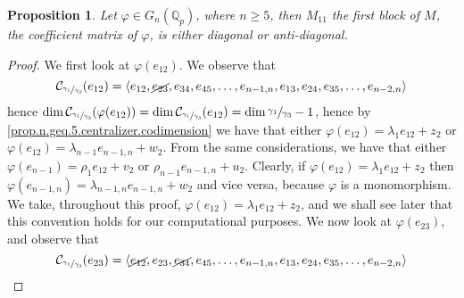 \documentclass[12pt]{article}
\newtheorem{proposition}[theorem]{Proposition}
\begin{document}
\begin{proposition}
\label{m11.n.5}
Let $\varphi\in G_n(\mathbb{Q}_p)$, where $n\geq 5$, then $M_{11}$ the first block of $M$, the coefficient matrix of $\varphi$, is either diagonal or anti-diagonal.
\end{proposition}
\begin{proof}
We first look at $\varphi(e_{12})$. We observe that \[\mathcal{C}_{\sfrac{\gamma_1}{\gamma_3}}(e_{12})=\langle e_{12},\cancel{e_{23}},e_{34},e_{45},\dots,e_{n-1,n},e_{13},e_{24},e_{35},\dots,e_{n-2,n}\rangle\] hence $\dim\mathcal{C}_{\sfrac{\gamma_1}{\gamma_3}}(\varphi(e_{12}))=\dim\mathcal{C}_{\sfrac{\gamma_1}{\gamma_3}}(e_{12})=\dim\sfrac{\gamma_1}{\gamma_3}-1$, hence by \ref{prop.n.geq.5.centralizer.codimension} we have that either $\varphi(e_{12})=\lambda_1 e_{12}+z_2$ or $\varphi(e_{12})=\lambda_{n-1}e_{n-1,n}+w_2$. From the same considerations, we have that either $\varphi(e_{n-1})=\rho_1 e_{12}+v_2$ or $\rho_{n-1}e_{n-1,n}+u_2$. Clearly, if $\varphi(e_{12})=\lambda_1 e_{12}+z_2$ then $\varphi(e_{n-1,n})=\lambda_{n-1,n} e_{n-1,n}+w_2$ and vice versa, because $\varphi$ is a monomorphism. We take, throughout this proof, $\varphi(e_{12})=\lambda_1 e_{12}+z_2$, and we shall see later that this convention holds for our computational purposes. We now look at $\varphi(e_{23})$, and observe that \[\mathcal{C}_{\sfrac{\gamma_1}{\gamma_3}}(e_{23})=\langle\cancel{e_{12}},e_{23},\cancel{e_{34}},e_{45},\dots,e_{n-1,n},e_{13},e_{24},e_{35},\dots,e_{n-2,n}\rangle\] 

\end{proof}
\end{document}
